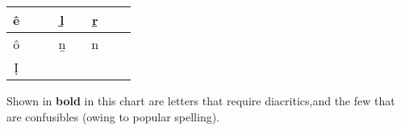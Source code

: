\begin{center}
\vskip 10pt

\begin{tabular}{|c|c!{\vrule width 0.8pt}c|c!{\vrule width 0.8pt}c|c!{\vrule width 0.8pt}c|c|}
\hline
ê &      &    & ḻ  &   &  ṟ  &  \\
\hline
ô &      &    &  ṉ &  &  n &  \\
\hline
Ị &      &    &  &  &   & \\
\hline
\end{tabular}
\egroup
\end{center}


Shown in \textbf{bold} in this chart are letters that require diacritics,\break and the few that are confusibles (owing to popular spelling).
